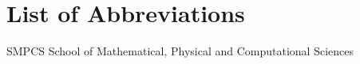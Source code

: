 \section{List of Abbreviations}
\begin{abbrv}
    
    \item[SMPCS]			School of Mathematical, Physical and Computational Sciences
    
\end{abbrv}
